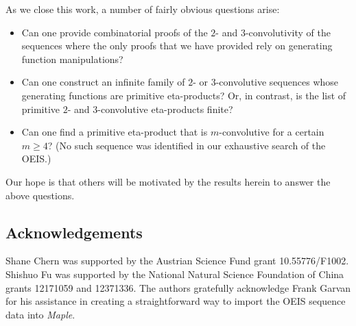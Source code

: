 \documentclass[12pt,reqno]{amsart}
\numberwithin{equation}{section}
\theoremstyle{plain}
\theoremstyle{definition}
\theoremstyle{named}
\begin{document}
As we close this work, a number of fairly obvious questions arise:
\begin{itemize}[itemsep=4pt]
	\item Can one provide combinatorial proofs of the $2$- and $3$-convolutivity of the sequences where the only proofs that we have provided rely on generating function manipulations?  
	

	\item Can one construct an infinite family of $2$- or $3$-convolutive sequences whose generating functions are primitive eta-products? Or, in contrast, is the list of primitive $2$- and $3$-convolutive eta-products finite?

	\item Can one find a primitive eta-product that is $m$-convolutive for a certain $m\ge 4$? (No such sequence was identified in our exhaustive search of the OEIS.)
\end{itemize}
Our hope is that others will be motivated by the results herein to answer the above questions.

\subsection*{Acknowledgements}

Shane Chern was supported by the Austrian Science Fund grant 10.55776/F1002. Shishuo Fu was supported by the National Natural Science Foundation of China grants 12171059 and 12371336. The authors gratefully acknowledge Frank Garvan for his assistance in creating a straightforward way to import the OEIS sequence data into \emph{Maple}.
\end{document}
